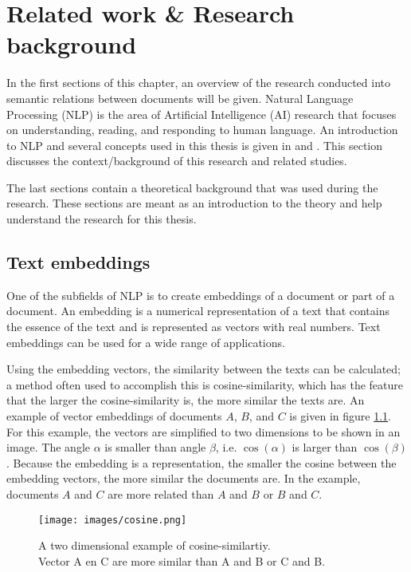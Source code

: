 \pagebreak
\chapter{Related work \& Research background}
\label{sectRelatedWork}
\label{sectBackground}


In the first sections of this chapter, an overview of the research conducted into semantic relations between documents will be given.  Natural Language Processing (NLP) is the area of Artificial Intelligence (AI) research that focuses on understanding, reading, and responding to human language. An introduction to NLP and several concepts used in this thesis is given in \citep{rao2019natural} and \citep{Goodfellow-et-al-2016}. This section discusses the context/background of this research and related studies. 

The last sections contain a theoretical background that was used during the research. These sections are meant as an introduction to the theory and help understand the research for this thesis.\\

\section{Text embeddings}

One of the subfields of NLP is to create embeddings of a document or part of a document. An embedding is a numerical representation of a text that contains the essence of the text and is represented as vectors with real numbers. Text embeddings can be used for a wide range of applications.

 Using the embedding vectors, the similarity between the texts can be calculated; a method often used to accomplish this is cosine-similarity, which has the feature that the larger the cosine-similarity is, the more similar the texts are. An example of vector embeddings of documents $A$, $B$, and $C$ is given in figure \ref{imgcossim}. For this example, the vectors are simplified to two dimensions to be shown in an image. The angle $\alpha$ is smaller than angle $\beta$, i.e. $\cos(\alpha)$ is larger than $\cos(\beta)$.  Because the embedding is a representation, the smaller the cosine between the embedding vectors, the more similar the documents are. In the example, documents $A$ and $C$ are more related than $A$ and $B$ or $B$ and $C$.

\begin{figure}[h]
\centering
\captionsetup{justification=centering}
\texttt{[image: images/cosine.png]}
\caption{A two dimensional example of cosine-similartiy.\\Vector A en C are more similar than A and B or C and B.}
\label{imgcossim}
\end{figure}



